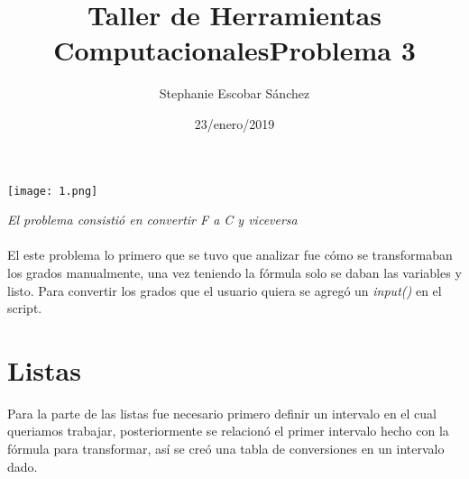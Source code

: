 \documentclass{article}
\title{\Huge Taller de Herramientas Computacionales}
\author{Stephanie Escobar Sánchez}
\date{23/enero/2019}
\begin{document}
	\maketitle
	\begin{center}
		\texttt{[image: 1.png]}	
	\end{center}
	\newpage
	\begin{center}
		\title {\Huge Problema 3} 
	\end{center}

\textit{El problema consistió en convertir F a C y viceversa}\\
\\

El este problema lo primero que se tuvo que analizar fue cómo se transformaban los grados manualmente, una vez teniendo la fórmula solo se daban las variables y listo. Para convertir los grados que el usuario quiera se agregó un \textit{input()} en el script.

\section*{Listas}

Para la parte de las listas fue necesario primero definir un intervalo en el cual queriamos trabajar, posteriormente se relacionó el primer intervalo hecho con la fórmula para transformar, así se creó una tabla de conversiones en un intervalo dado.
\end{document}
